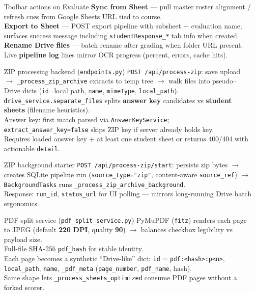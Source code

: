 \documentclass[aspectratio=169]{beamer}
\begin{document}
\begin{frame}{Toolbar actions on Evaluate}
  \small
  \textbf{Sync from Sheet} --- pull master roster alignment / refresh cues from Google Sheets URL tied to course.\\
  \textbf{Export to Sheet} --- POST export pipeline with subsheet + evaluation name; surfaces success message including \texttt{studentResponse\_*} tab info when created.\\
  \textbf{Rename Drive files} --- batch rename after grading when folder URL present.\\
  Live \textbf{pipeline log} lines mirror OCR progress (percent, errors, cache hits).
\end{frame}

\begin{frame}{ZIP processing backend (\texttt{endpoints.py})}
  \small
  \texttt{POST /api/process-zip}: save upload $\rightarrow$ \texttt{\_process\_zip\_archive} extracts to temp tree $\rightarrow$ walk files into pseudo--Drive dicts (\texttt{id}=local path, \texttt{name}, \texttt{mimeType}, \texttt{local\_path}).\\
  \texttt{drive\_service.separate\_files} splits \textbf{answer key} candidates vs \textbf{student sheets} (filename heuristics).\\
  Answer key: first match parsed via \texttt{AnswerKeyService}; \texttt{extract\_answer\_key=false} skips ZIP key if server already holds key.\\
  Requires loaded answer key + at least one student sheet or returns 400/404 with actionable \texttt{detail}.
\end{frame}

\begin{frame}{ZIP background starter}
  \small
  \texttt{POST /api/process-zip/start}: persists zip bytes $\rightarrow$ creates SQLite pipeline run (\texttt{source\_type="zip"}, content-aware \texttt{source\_ref}) $\rightarrow$ \texttt{BackgroundTasks} runs \texttt{\_process\_zip\_archive\_background}.\\
  Response: \texttt{run\_id}, \texttt{status\_url} for UI polling --- mirrors long-running Drive batch ergonomics.
\end{frame}

\begin{frame}{PDF split service (\texttt{pdf\_split\_service.py})}
  \small
  PyMuPDF (\texttt{fitz}) renders each page to JPEG (default \textbf{220 DPI}, quality \textbf{90}) $\rightarrow$ balances checkbox legibility vs payload size.\\
  Full-file SHA-256 \texttt{pdf\_hash} for stable identity.\\
  Each page becomes a synthetic ``Drive-like'' dict: \texttt{id} = \texttt{pdf:<hash>:p<n>}, \texttt{local\_path}, \texttt{name}, \texttt{\_pdf\_meta} (\texttt{page\_number}, \texttt{pdf\_name}, hash).\\
  Same shape lets \texttt{\_process\_sheets\_optimized} consume PDF pages without a forked scorer.
\end{frame}
\end{document}
